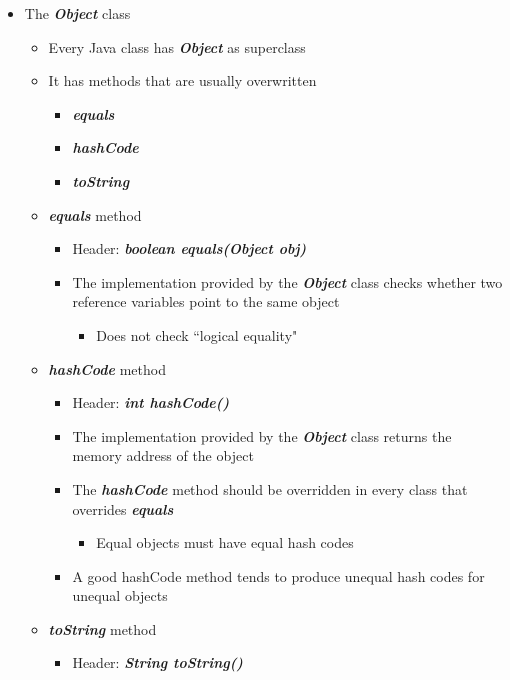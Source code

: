 \documentclass[11pt]{article}
\begin{document}
\begin{itemize}
	\newpage
	\item The \textbf{\textit{Object}} class
		\begin{itemize}
			\item Every Java class has \textbf{\textit{Object}} as superclass
			\item It has methods that are usually overwritten
				\begin{itemize}
					\item \textbf{\textit{equals}}
					\item \textbf{\textit{hashCode }}
					\item \textbf{\textit{toString}}
				\end{itemize}
			\item \textbf{\textit{equals}} method
				\begin{itemize}
					\item Header: \textbf{\textit{boolean equals(Object obj)}}
					\item The implementation provided by the \textbf{\textit{Object}} class checks whether two reference variables point to the same object
						\begin{itemize}
						\item 	Does not check ``logical equality"
						\end{itemize}
				\end{itemize}
			\item \textbf{\textit{hashCode}} method
				\begin{itemize}
					\item  Header: \textbf{\textit{int hashCode()}}
					\item  The implementation provided by the \textbf{\textit{Object}} class returns the memory address of the object
					\item The \textbf{\textit{hashCode}} method should be overridden in every class that overrides \textbf{\textit{equals}}
						\begin{itemize}
							\item Equal objects must have equal hash codes
						\end{itemize}
					\item A good hashCode method tends to produce unequal hash
					codes for unequal objects
				\end{itemize}
			\item \textbf{\textit{toString}} method
				\begin{itemize}
					\item Header: \textbf{\textit{String toString()}}

\end{itemize}
\end{itemize}
\end{itemize}
\end{document}
